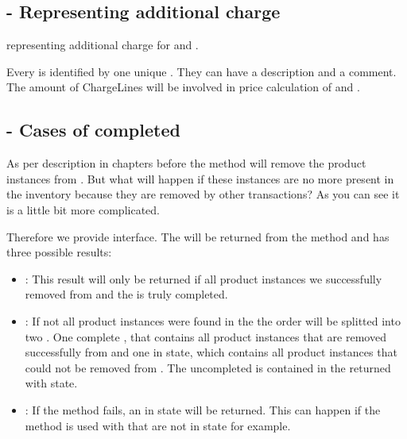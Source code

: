 \subsection{ - Representing additional charge}
 representing additional charge for  and . 

Every  is identified by one unique . They can have a description and a comment. The amount of ChargeLines will be involved in price calculation of  and .

\subsection{ - Cases of completed }
As per description in chapters before the  method will remove the product instances from . But what will happen if these instances are no more present in the inventory because they are removed by other transactions? As you can see it is a little bit more complicated. 

Therefore we provide  interface. The  will be returned from the  method and has three possible results:

\begin{itemize}
\item {}: This result will only be returned if all product instances we successfully removed from  and the  is truly completed. 
\item {}: If not all product instances were found in the  the order will be splitted into two . One complete , that contains all product instances that are removed successfully from  and one  in  state, which contains all product instances that could not be removed from . The uncompleted is contained in the returned  with  state.
\item {}: If the  method fails, an  in  state will be returned. This can happen if the  method is used with  that are not in  state for example.
\end{itemize}

